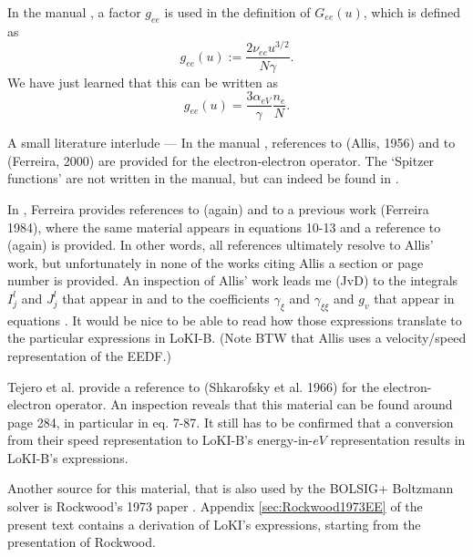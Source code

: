 \documentclass{book}
\begin{document}
In the manual \cite[eq. 37a]{Manual_2_2_0}, a factor $g_{ee}$ is used in the definition of $G_{ee}(u)$,
which is defined as
\begin{equation}
	g_{ee}(u) := \frac{2\nu_{ee}u^{3/2}}{N\gamma}.
\end{equation}
We have just learned that this can be written as
\begin{equation}
	g_{ee}(u) = \frac{3\alpha_{eV}}{\gamma}\frac{n_e}{N}.
\end{equation}

\begin{framed}
A small literature interlude ---
In the manual \cite{Manual_2_2_0}, references to \cite{Allis1956} (Allis, 1956) and to
\cite{Ferreira2000} (Ferreira, 2000) are provided for the electron-electron operator.
The `Spitzer functions' are not written in the manual, but can indeed be found in
\cite[eqns. 59--62]{Ferreira2000}.

In \cite{Ferreira2000}, Ferreira provides references to (again) \cite{Allis1956} and to a previous
work \cite{Ferreira1984} (Ferreira 1984), where the same material appears in equations 10-13
and a reference to (again) \cite{Allis1956} is provided. In other words, all references
ultimately resolve to Allis' work, but unfortunately in none of the works citing Allis a
section or page number is provided. An inspection of Allis' work leads me (JvD) to the integrals
$I_j^l$ and $J_j^l$ that appear in \cite[eq. 51.8]{Allis1956} and to the coefficients
$\gamma_\xi$ and $\gamma_{\xi\xi}$ and $g_v$ that appear in equations \cite[eq. 53.3-5]{Allis1956}.
It would be nice to be able to read how those expressions translate to the particular expressions
in LoKI-B. (Note BTW that Allis uses a velocity/speed representation of the EEDF.)

Tejero et al. \cite[above eq. 6a]{Tejero2019} provide a reference to \cite{Shkarofsky1966}
(Shkarofsky et al. 1966) for the electron-electron operator. An inspection reveals that this
material can be found around page 284, in particular in eq. 7-87. It still has to be confirmed
that a conversion from their speed representation to LoKI-B's energy-in-$\si{eV}$ representation
results in LoKI-B's expressions.

Another source for this material, that is also used by the BOLSIG+ Boltzmann solver \cite{Hagelaar2005}
is Rockwood's 1973 paper \cite{Rockwood1973}. Appendix \ref{sec:Rockwood1973EE} of the present
text contains a derivation of LoKI's expressions, starting from the presentation of Rockwood.
\end{framed}
\end{document}
